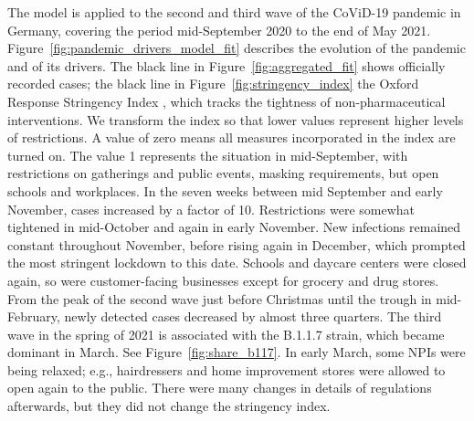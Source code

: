 The model is applied to the second and third wave of the CoViD-19 pandemic in Germany,
covering the period mid-September 2020 to the end of May 2021.
Figure~\ref{fig:pandemic_drivers_model_fit} describes the evolution of the pandemic and
of its drivers. The black line in Figure~\ref{fig:aggregated_fit} shows officially
recorded cases; the black line in Figure~\ref{fig:stringency_index} the Oxford Response
Stringency Index \citep{Hale2020}, which tracks the tightness of non-pharmaceutical
interventions. We transform the index so that lower values represent higher levels of
restrictions. A value of zero means all measures incorporated in the index are turned
on. The value 1 represents the situation in mid-September, with restrictions on
gatherings and public events, masking requirements, but open schools and workplaces. In
the seven weeks between mid September and early November, cases increased by a factor of
10. Restrictions were somewhat tightened in mid-October and again in early November. New
infections remained constant throughout November, before rising again in December, which
prompted the most stringent lockdown to this date. Schools and daycare centers were
closed again, so were customer-facing businesses except for grocery and drug stores.
From the peak of the second wave just before Christmas until the trough in mid-February,
newly detected cases decreased by almost three quarters. The third wave in the spring of
2021 is associated with the B.1.1.7 strain, which became dominant in March. See
Figure~\ref{fig:share_b117}. In early March, some NPIs were being relaxed; e.g.,
hairdressers and home improvement stores were allowed to open again to the public. There
were many changes in details of regulations afterwards, but they did not change the
stringency index.

